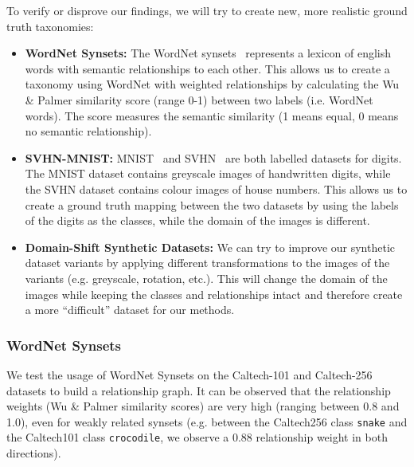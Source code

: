 To verify or disprove our findings, we will try to create new, more realistic ground truth taxonomies:
\begin{itemize}
      \item \textbf{WordNet Synsets:} The WordNet synsets~\cite{fellbaum_wordnet_1998,noauthor_wordnet_nodate}
            represents a lexicon of english words with semantic relationships to each other.
            This allows us to create a taxonomy using WordNet with weighted relationships by calculating
            the Wu \& Palmer similarity score (range 0-1) between two labels (i.e. WordNet words).
            The score measures the semantic similarity (1 means equal, 0 means no semantic relationship).
      \item \textbf{SVHN-MNIST:} MNIST~\cite{deng_mnist_2012} and SVHN~\cite{netzer_reading_2011} are both labelled datasets
            for digits. The MNIST dataset contains greyscale images of handwritten digits,
            while the SVHN dataset contains colour images of house numbers.
            This allows us to create a ground truth mapping between the two datasets
            by using the labels of the digits as the classes, while the domain of the images
            is different.
      \item \textbf{Domain-Shift Synthetic Datasets:} We can try to improve our synthetic dataset variants
            by applying different transformations to the images of the variants (e.g. greyscale, rotation, etc.).
            This will change the domain of the images while keeping the classes and relationships intact
            and therefore create a more \enquote{difficult} dataset for our methods.
\end{itemize}

\subsubsection{WordNet Synsets} \label{sec:wordnet_synsets}

We test the usage of WordNet Synsets on the Caltech-101 and Caltech-256 datasets to build a relationship graph.
It can be observed that the relationship weights (Wu \& Palmer similarity scores) are very high (ranging between 0.8 and 1.0),
even for weakly related synsets (e.g. between the Caltech256 class \texttt{snake} and the Caltech101 class \texttt{crocodile},
we observe a 0.88 relationship weight in both directions).

